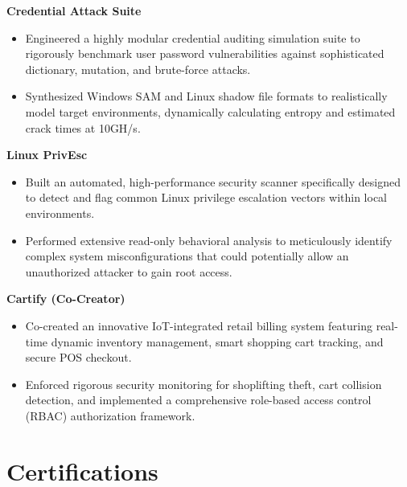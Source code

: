 \documentclass[a4paper,11pt]{article}
\begin{document}
\noindent\textbf{Credential Attack Suite} \\
\begin{itemize}[leftmargin=16pt, itemsep=1pt, topsep=2pt, parsep=0pt, label={\textcolor{accent}{\small\textbullet}}]
  \item Engineered a highly modular credential auditing simulation suite to rigorously benchmark user password vulnerabilities against sophisticated dictionary, mutation, and brute-force attacks.
  \item Synthesized Windows SAM and Linux shadow file formats to realistically model target environments, dynamically calculating entropy and estimated crack times at 10GH/s.
\end{itemize}
\vspace{6pt}

\noindent\textbf{Linux PrivEsc} \\
\begin{itemize}[leftmargin=16pt, itemsep=1pt, topsep=2pt, parsep=0pt, label={\textcolor{accent}{\small\textbullet}}]
  \item Built an automated, high-performance security scanner specifically designed to detect and flag common Linux privilege escalation vectors within local environments.
  \item Performed extensive read-only behavioral analysis to meticulously identify complex system misconfigurations that could potentially allow an unauthorized attacker to gain root access.
\end{itemize}
\vspace{6pt}

\noindent\textbf{Cartify (Co-Creator)} \\
\begin{itemize}[leftmargin=16pt, itemsep=1pt, topsep=2pt, parsep=0pt, label={\textcolor{accent}{\small\textbullet}}]
  \item Co-created an innovative IoT-integrated retail billing system featuring real-time dynamic inventory management, smart shopping cart tracking, and secure POS checkout.
  \item Enforced rigorous security monitoring for shoplifting theft, cart collision detection, and implemented a comprehensive role-based access control (RBAC) authorization framework.
\end{itemize}
\vspace{6pt}

\section{Certifications}
\end{document}

